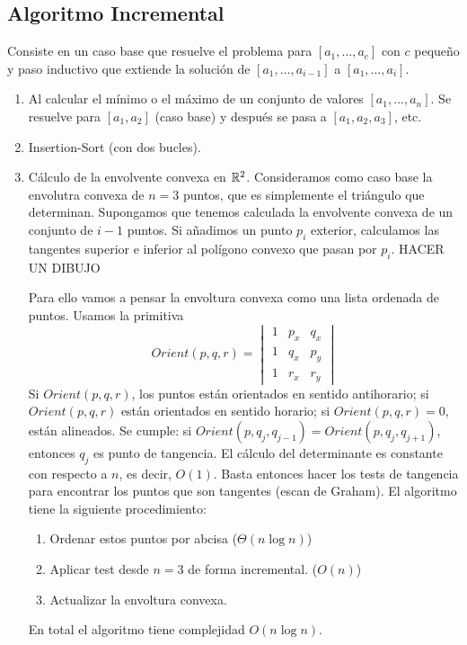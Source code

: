 \documentclass[AL.tex]{subfiles}
\begin{document}
\subsection{Algoritmo Incremental}
Consiste en un caso base que resuelve el problema para $[a_1,\dots, a_c]$ con $c$ pequeño y paso inductivo que extiende la solución de $[a_1,\dots, a_{i-1}]$ a $[a_1,\dots, a_i]$. 
\begin{ejs}
\begin{enumerate}
\item
 Al calcular el mínimo o el máximo de un conjunto de valores $[a_1,\dots, a_n]$. Se resuelve para $[a_1,a_2]$ (caso base) y después se pasa a $[a_1,a_2,a_3]$, etc. 
 
 \item Insertion-Sort (con dos bucles).
 
 \item Cálculo de la envolvente convexa en $\mathbb{R}^2$. Consideramos como caso base la envolutra convexa de $n=3$ puntos, que es simplemente el triángulo que determinan. Supongamos que tenemos calculada la envolvente convexa de un conjunto de $i-1$ puntos. Si añadimos un punto $p_i$ exterior, calculamos las tangentes superior e inferior al polígono convexo que pasan por $p_i$. HACER UN DIBUJO
 
 Para ello vamos a pensar la envoltura convexa como una lista ordenada de puntos. Usamos la primitiva $$Orient(p,q,r)=\begin{vmatrix}
 1 & p_x & q_x\\
 1 & q_x & p_y\\
 1 & r_x & r_y
 \end{vmatrix}$$
 Si $Orient(p,q,r)$, los puntos están orientados en sentido antihorario; si $Orient(p,q,r)$ están orientados en sentido horario; si $Orient(p,q,r)=0$, están alineados. Se cumple: si $Orient(p,q_j,q_{j-1})=Orient(p,q_j,q_{j+1})$, entonces $q_j$ es punto de tangencia. El cálculo del determinante es constante con respecto a $n$, es decir, $O(1)$. Basta entonces hacer los tests de tangencia para encontrar los puntos que son tangentes (escan de Graham). El algoritmo tiene la siguiente procedimiento:
 \begin{enumerate}
 \item Ordenar estos puntos por abcisa ($\Theta(n\log n)$)
 \item Aplicar test desde $n=3$ de forma incremental. ($O(n)$)
 \item Actualizar la envoltura convexa. 
 \end{enumerate}
 En total el algoritmo tiene complejidad $O(n\log n)$. 
\end{enumerate}
\end{ejs}
\end{document}
